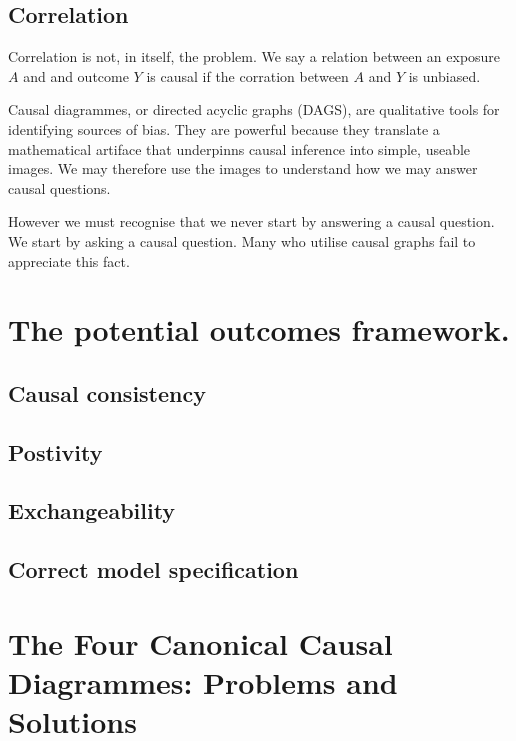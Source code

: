 \documentclass[
  singlecolumn]{report}
\begin{document}
\hypertarget{correlation}{%
\subsection{Correlation}\label{correlation}}

Correlation is not, in itself, the problem. We say a relation between an
exposure \(A\) and and outcome \(Y\) is causal if the corration between
\(A\) and \(Y\) is unbiased.

Causal diagrammes, or directed acyclic graphs (DAGS), are qualitative
tools for identifying sources of bias. They are powerful because they
translate a mathematical artiface that underpinns causal inference into
simple, useable images. We may therefore use the images to understand
how we may answer causal questions.

However we must recognise that we never start by answering a causal
question. We start by asking a causal question. Many who utilise causal
graphs fail to appreciate this fact.

\hypertarget{the-potential-outcomes-framework.}{%
\section{The potential outcomes
framework.}\label{the-potential-outcomes-framework.}}

\hypertarget{causal-consistency}{%
\subsection{Causal consistency}\label{causal-consistency}}

\hypertarget{postivity}{%
\subsection{Postivity}\label{postivity}}

\hypertarget{exchangeability}{%
\subsection{Exchangeability}\label{exchangeability}}

\hypertarget{correct-model-specification}{%
\subsection{Correct model
specification}\label{correct-model-specification}}

\hypertarget{the-four-canonical-causal-diagrammes-problems-and-solutions}{%
\section{The Four Canonical Causal Diagrammes: Problems and
Solutions}\label{the-four-canonical-causal-diagrammes-problems-and-solutions}}
\end{document}
